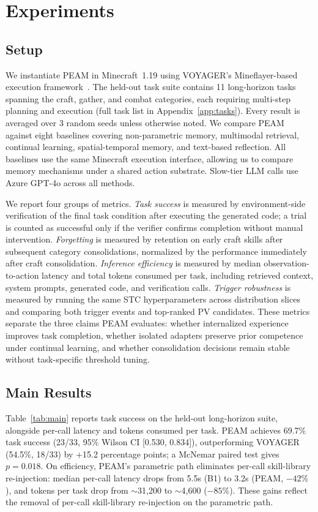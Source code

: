 \documentclass[11pt]{article}
\begin{document}
\section{Experiments}

\subsection{Setup}
We instantiate PEAM in Minecraft~1.19 using VOYAGER's Mineflayer-based execution framework~\cite{wang2023voyager}. The held-out task suite contains 11 long-horizon tasks spanning the craft, gather, and combat categories, each requiring multi-step planning and execution (full task list in Appendix~\ref{app:tasks}). Every result is averaged over 3 random seeds unless otherwise noted. We compare PEAM against eight baselines covering non-parametric memory, multimodal retrieval, continual learning, spatial-temporal memory, and text-based reflection. All baselines use the same Minecraft execution interface, allowing us to compare memory mechanisms under a shared action substrate. Slow-tier LLM calls use Azure GPT-4o across all methods.

We report four groups of metrics. \emph{Task success} is measured by environment-side verification of the final task condition after executing the generated code; a trial is counted as successful only if the verifier confirms completion without manual intervention. \emph{Forgetting} is measured by retention on early craft skills after subsequent category consolidations, normalized by the performance immediately after craft consolidation. \emph{Inference efficiency} is measured by median observation-to-action latency and total tokens consumed per task, including retrieved context, system prompts, generated code, and verification calls. \emph{Trigger robustness} is measured by running the same STC hyperparameters across distribution slices and comparing both trigger events and top-ranked PV candidates. These metrics separate the three claims PEAM evaluates: whether internalized experience improves task completion, whether isolated adapters preserve prior competence under continual learning, and whether consolidation decisions remain stable without task-specific threshold tuning.

\subsection{Main Results}
Table~\ref{tab:main} reports task success on the held-out long-horizon suite, alongside per-call latency and tokens consumed per task. PEAM achieves 69.7\% task success (23/33, 95\% Wilson CI [0.530, 0.834]), outperforming VOYAGER (54.5\%, 18/33) by +15.2 percentage points; a McNemar paired test gives $p=0.018$. On efficiency, PEAM's parametric path eliminates per-call skill-library re-injection: median per-call latency drops from 5.5s (B1) to 3.2s (PEAM, $-42\%$), and tokens per task drop from $\sim$31{,}200 to $\sim$4{,}600 ($-85\%$). These gains reflect the removal of per-call skill-library re-injection on the parametric path.
\end{document}
